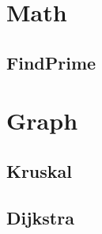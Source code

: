 \section{Math}
    \subsection{FindPrime}
        
\section{Graph}
    \subsection{Kruskal}
        
    \subsection{Dijkstra}
        

